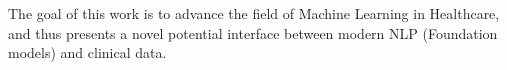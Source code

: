 \documentclass{article}
\theoremstyle{plain}
\theoremstyle{definition}
\theoremstyle{remark}
\begin{document}
The goal of this work is to advance the field of Machine Learning in Healthcare, and thus presents a novel potential interface between modern NLP (Foundation models) and clinical data. 



\end{document}
